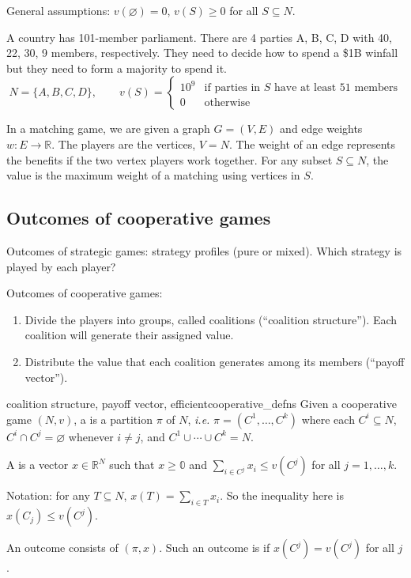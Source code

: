 \documentclass[12pt,letterpaper]{report}
\begin{document}
General assumptions: $v(\varnothing) = 0$, $v(S) \geq 0$ for all $S \subseteq N$.

\begin{ex}
  A country has 101-member parliament.
  There are 4 parties A, B, C, D with 40, 22, 30, 9 members, respectively.
  They need to decide how to spend a \$1B winfall but they need to form a majority to spend it.
  \[
    N = \{A, B, C, D\}, \qquad v(S) = \begin{cases}
      10^9 & \text{if parties in } S \text{ have at least 51 members} \\
      0 & \text{otherwise}
    \end{cases}
  \]
\end{ex}

\begin{ex}
  In a matching game, we are given a graph $G = (V, E)$ and edge weights
  $w \colon E \to \mathbb{R}$.
  The players are the vertices, $V = N$.
  The weight of an edge represents the benefits if the two vertex players work together.
  For any subset $S \subseteq N$, the value is the maximum weight of a matching using vertices in
  $S$.
\end{ex}

\subsection{Outcomes of cooperative games}

Outcomes of strategic games: strategy profiles (pure or mixed).
Which strategy is played by each player?

Outcomes of cooperative games:
\begin{enumerate}
  \item
  Divide the players into groups, called coalitions (``coalition structure'').
  Each coalition will generate their assigned value.
  \item
  Distribute the value that each coalition generates among its members (``payoff vector'').
\end{enumerate}

\begin{defn}{coalition structure, payoff vector, efficient}{cooperative_defns}
  Given a cooperative game $(N, v)$, a  is a partition $\pi$ of $N$,
  \emph{i.e.} $\pi = (C^1, \ldots, C^k)$ where each $C^i \subseteq N$, $C^i \cap C^j = \varnothing$
  whenever $i \neq j$, and $C^1 \cup \cdots \cup C^k = N$.

  A  is a vector $x \in \mathbb{R}^N$ such that $x \geq \mathbb{0}$ and
  $\sum\limits_{i \in C^j} x_i \leq v(C^j)$ for all $j = 1, \ldots, k$.

  Notation: for any $T \subseteq N$, $x(T) = \sum\limits_{i \in T} x_i$.
  So the inequality here is $x(C_j) \leq v(C^j)$.

  An outcome consists of $(\pi, x)$.
  Such an outcome is  if $x(C^j) = v(C^j)$ for all $j$.
\end{defn}
\end{document}
